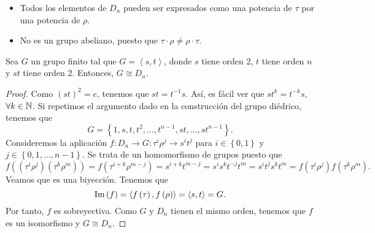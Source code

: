 \begin{itemize}
\item Todos los elementos de $\displaystyle D_{n} $ pueden ser expresados como una potencia de $\displaystyle \tau $ por una potencia de $\displaystyle \rho $.
\item No es un grupo abeliano, puesto que $\displaystyle \tau \cdot \rho \neq \rho \cdot \tau $. 
\end{itemize}
\begin{prop}
Sea $\displaystyle G $ un grupo finito tal que $\displaystyle G = \left\langle s, t \right\rangle  $, donde $\displaystyle s $ tiene orden 2, $\displaystyle t $ tiene orden $\displaystyle n $ y $\displaystyle st $ tiene orden 2. Entonces, $\displaystyle G \cong D_{n} $. 
\end{prop}
\begin{proof}
Como $\displaystyle \left(st\right)^{2} = e $, tenemos que $\displaystyle st = t ^{-1}s $. Así, es fácil ver que $\displaystyle st^{k} = t ^{-k}s$, $\displaystyle \forall k \in \mathbb{N} $. Si repetimos el argumento dado en la construcción del grupo diédrico, tenemos que 
\[G = \left\{ 1, s, t, t ^{2}, \ldots, t ^{n-1}, st, \ldots, s t ^{n-1}\right\}  .\]
Consideremos la aplicación $\displaystyle f : D_{n} \to G : \tau^{i}\rho^{j} \to s ^{i}t ^{j} $ para $\displaystyle i \in \left\{ 0,1\right\}  $ y $\displaystyle j \in \left\{ 0, 1, \ldots, n -1\right\}  $. Se trata de un homomorfismo de grupos puesto que 
\[f\left(\left(\tau^{i}\rho^{j}\right)\left(\tau^{k}\rho^{m}\right)\right) = f\left(\tau^{i +k}\rho^{m - j}\right) = s ^{i + k} t ^{m - j} = s^{i}s^{k}t ^{-j}t^{m} = s^{i}t ^{j}s^{k}t ^{m} = f\left(\tau^{i}\rho^{j}\right)f\left(\tau^{k}\rho^{m}\right) .\]
Veamos que es una biyección. Tenemos que 
\[\operatorname{Im}\left(f\right) = \left\langle f\left(\tau\right), f\left(\rho\right) \right\rangle = \left\langle s, t \right\rangle  = G .\]
Por tanto, $\displaystyle f $ es sobreyectiva. Como $\displaystyle G $ y $\displaystyle D_{n} $ tienen el mismo orden, tenemos que $\displaystyle f $ es un isomorfismo y $\displaystyle G \cong D_{n} $. 
\end{proof}
